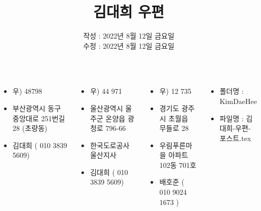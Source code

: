 \documentclass[	20pt, 
							a1paper, 
							portrait, %
							margin=0mm, %
							innermargin=10mm,  		%
							colspace=5mm, 
							subcolspace=0mm
							]{tikzposter}
\title{김대희 우편 }
\author{ 	작성 : 2022년 8월 12일 금요일 \\
			수정 : 2022년 8월 12일 금요일 }
\begin{document}
	\maketitle

	\begin{columns}


			{
				\begin{LARGE}
					\begin{itemize}
					\item 우)  48798
					\item 부산광역시 동구 중앙대로 251번길 28 (초량동)
					\item 김대희 ( 010 3839 5609)
					\end{itemize}
				\end{LARGE}
			}


			{
				\begin{LARGE}
					\begin{itemize}
					\item 우)  44 971
					\item 울산광역시 울주군 온양읍 광청로 796-66
					\item 한국도로공사 울산지사 
					\item 김대희 ( 010 3839 5609)
					\end{itemize}
				\end{LARGE}
			}



			{
				\begin{LARGE}
					\begin{itemize}
					\item 우)  12 735
					\item 경기도 광주시 초월읍 무들로 28
					\item 우림푸른마을 아파트 102동 701호
					\item 배호준 ( 010 9024 1673 )
					\end{itemize}
				\end{LARGE}
			}


			{
				\begin{LARGE}
					\begin{itemize}
					\item 폴더명 : KimDaeHee
					\item 파일명 : 김대희-우편-포스트.tex
					\end{itemize}
				\end{LARGE}
			}




	\end{columns}
\end{document}
